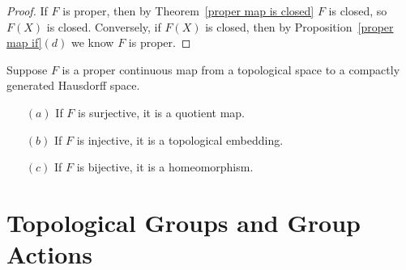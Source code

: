 \begin{proof}
If $F$ is proper, then by Theorem~\ref{proper map is closed} $F$ is closed, so $F(X)$ is closed. Conversely, if $F(X)$ is closed, then by Proposition~\ref{proper map if}$(d)$ we know $F$ is proper.
\end{proof}
\begin{corollary}
Suppose $F$ is a proper continuous map from a topological space to a compactly generated Hausdorff space.
\begin{itemize}
\item[$(a)$]If $F$ is surjective, it is a quotient map.
\item[$(b)$]If $F$ is injective, it is a topological embedding.
\item[$(c)$]If $F$ is bijective, it is a homeomorphism.
\end{itemize}
\end{corollary}
\vspace{5mm}
\section{Topological Groups and Group Actions}

